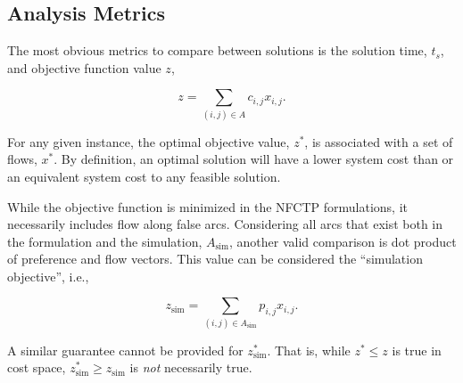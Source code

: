 \subsection{Analysis Metrics}

The most obvious metrics to compare between solutions is the solution time,
$t_s$, and objective function value $z$,

\begin{equation}\label{eqn:obj_flow}
z = \sum_{(i, j) \in A} c_{i, j} x_{i, j}.
\end{equation}

For any given instance, the optimal objective value, $z^*$, is associated with a
set of flows, $x^*$. By definition, an optimal solution will have a lower system
cost than or an equivalent system cost to any feasible solution.

While the objective function is minimized in the NFCTP formulations, it
necessarily includes flow along false arcs. Considering all arcs that exist both
in the formulation and the simulation, $A_{\text{sim}}$, another valid
comparison is dot product of preference and flow vectors. This value can be
considered the ``simulation objective'', i.e.,

\begin{equation}\label{eqn:sim_flow}
z_{\text{sim}} = \sum_{(i, j) \in A_{\text{sim}}} p_{i, j} x_{i, j}.
\end{equation}

A similar guarantee cannot be provided for $z^*_{\text{sim}}$. That is, while
$z^* \leq z$ is true in cost space, $z^*_{\text{sim}} \geq z_{\text{sim}}$ is
\textit{not} necessarily true.



